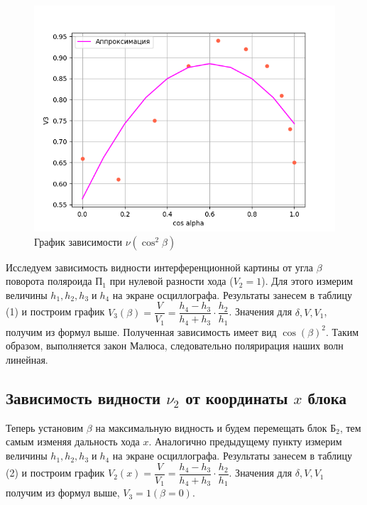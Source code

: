 \documentclass[a4paper,12pt]{article}
\begin{document}
\begin{figure}[h!]
	\begin{center}
		\includegraphics[scale = 0.8]{452_1.png}
	\end{center}
	\caption{График зависимости $ \nu({\cos}^2 \beta) $}
\end{figure}

\newpage
Исследуем зависимость видности интерференционной картины от угла
$ \beta $ поворота поляроида $ \text{П}_1 $ при нулевой разности хода ($ V_2 = 1 $). Для этого измерим величины $ h_1, h_2, h_3 \; \text{и} \; h_4 $ на экране осциллографа. Результаты занесем в таблицу (1) и построим график $V_3(\beta) = \dfrac{V}{V_1} = \dfrac{h_4 - h_3}{h_4 + h_3} \cdot \dfrac{h_2}{h_1}
$. Значения для $ \delta, V, V_1 $, получим из формул выше.
Полученная зависимость имеет вид $\cos(\beta)^2$. Таким образом, выполняется закон Малюса, следовательно полярирация наших волн линейная.

\subsection{Зависимость видности $\nu_2$ от координаты $x$ блока}

Теперь установим $ \beta $ на максимальную видность и будем перемещать блок $ \text{Б}_2 $, тем самым изменяя дальность хода $ x $. Аналогично предыдущему пункту измерим величины $ h_1, h_2, h_3 \; \text{и} \; h_4 $ на экране осциллографа. Результаты занесем в таблицу (2) и построим график $V_2 (x) = \dfrac{V}{V_1} = \dfrac{h_4 - h_3}{h_4 + h_3} \cdot \dfrac{h_2}{h_1}$. Значения для $ \delta, V, V_1 $ получим из формул выше, $V_3 = 1 (\beta = 0) $.
\end{document}
